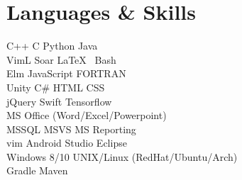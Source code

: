 \documentclass[letterpaper]{headers} %
\begin{document}
\begin{minipage}[t]{0.33\textwidth}
\section{Languages \& Skills}
	C++ \textbullet{} C \textbullet{} Python \textbullet{} Java \\
	VimL \textbullet{} Soar \textbullet{} \LaTeX\ \textbullet{} Bash \\
	Elm \textbullet{} JavaScript \textbullet{} FORTRAN \\
	Unity \textbullet{} C\# \textbullet{} HTML \textbullet{} CSS\\
	jQuery \textbullet{} Swift \textbullet{} Tensorflow \\
	\sectionspace
	MS Office (Word/Excel/Powerpoint) \\
	MSSQL \textbullet{} MSVS \textbullet{} MS Reporting \\
	vim \textbullet{} Android Studio \textbullet{} Eclipse \\
	Windows 8/10 \textbullet{} UNIX/Linux (RedHat/Ubuntu/Arch) \\
	Gradle \textbullet{} Maven
	
\end{minipage}
\hfill
%
\end{document}
